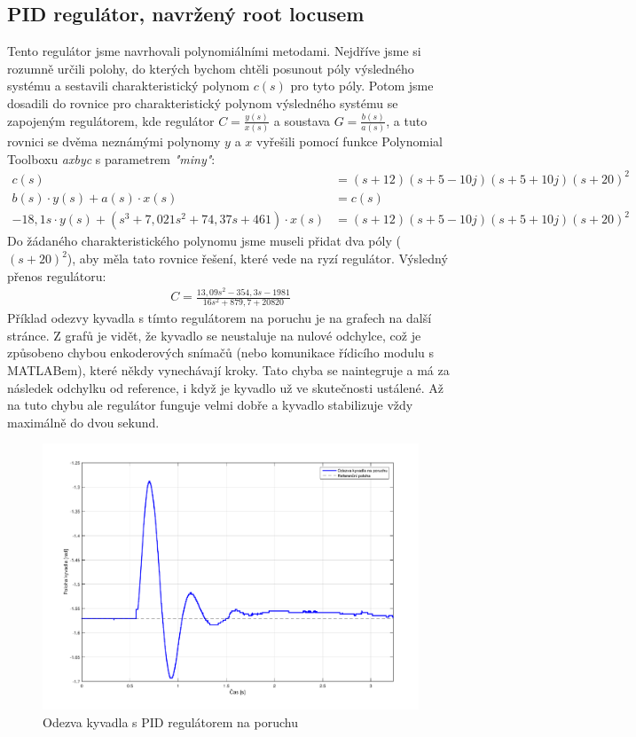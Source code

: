 \documentclass[a4paper,12pt]{article}
\begin{document}
\subsection{PID regulátor, navržený root locusem}
Tento regulátor jsme navrhovali polynomiálními metodami. Nejdříve jsme si rozumně určili polohy, do kterých bychom chtěli posunout póly výsledného systému a sestavili charakteristický polynom $c(s)$ pro tyto póly. Potom jsme dosadili do rovnice pro charakteristický polynom výsledného systému se zapojeným regulátorem, kde regulátor $C = \frac{y(s)}{x(s)}$ a soustava $G = \frac{b(s)}{a(s)}$, a tuto rovnici se dvěma neznámými polynomy $y$ a $x$ vyřešili pomocí funkce Polynomial Toolboxu \textit{axbyc} s parametrem \textit{"miny"}:
\begin{align*}
c(s) &= (s + 12) (s + 5 - 10j) (s + 5 + 10j) (s + 20)^2	\\
b(s)\cdot y(s) + a(s)\cdot x(s) &= c(s)	\\
-18,1s\cdot y(s) + (s^3 + 7,021s^2 + 74,37s + 461)\cdot x(s) &=  (s + 12) (s + 5 - 10j) (s + 5 + 10j) (s + 20)^2
\end{align*}
Do žádaného charakteristického polynomu jsme museli přidat dva póly ($(s+20)^2$), aby měla tato rovnice řešení, které vede na ryzí regulátor.
\newline
Výsledný přenos regulátoru:
\begin{align*}
C = \frac{13,09s^2 - 354,3s - 1981}{16s^2 + 879,7 + 20820}
\end{align*}
Příklad odezvy kyvadla s tímto regulátorem na poruchu je na grafech na další stránce. Z grafů je vidět, že kyvadlo se neustaluje na nulové odchylce, což je způsobeno chybou enkoderových snímačů (nebo komunikace řídicího modulu s MATLABem), které někdy vynechávají kroky. Tato chyba se naintegruje a má za následek odchylku od reference, i když je kyvadlo už ve skutečnosti ustálené.
\newline
\newline
Až na tuto chybu ale regulátor funguje velmi dobře a kyvadlo stabilizuje vždy maximálně do dvou sekund.
\begin{figure}[H]
	\centering
    \includegraphics[scale=0.55]{odezva_kyvadlo_PID}
    \caption{Odezva kyvadla s PID regulátorem na poruchu}
\end{figure}
\end{document}
